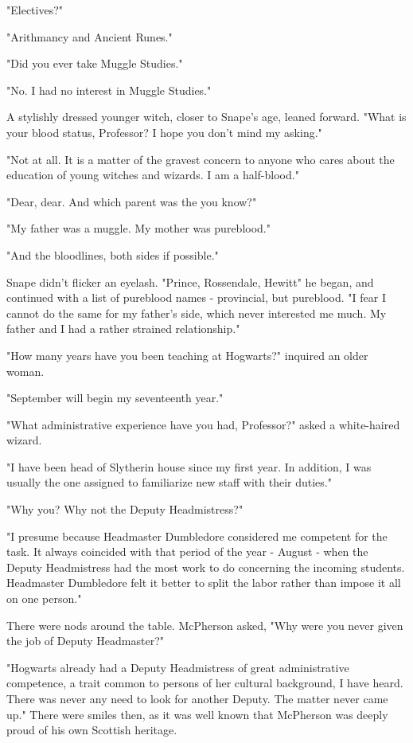 "Electives?"

"Arithmancy and Ancient Runes."

"Did you ever take Muggle Studies."

"No. I had no interest in Muggle Studies."

A stylishly dressed younger witch, closer to Snape's age, leaned forward. "What is your blood status, Professor? I hope you don't mind my asking."

"Not at all. It is a matter of the gravest concern to anyone who cares about the education of young witches and wizards. I am a half-blood."

"Dear, dear. And which parent was the{\el} you know?"

"My father was a muggle. My mother was pureblood."

"And the bloodlines, both sides if possible."

Snape didn't flicker an eyelash. "Prince, Rossendale, Hewitt{\el}" he began, and continued with a list of pureblood names - provincial, but pureblood. "I fear I cannot do the same for my father's side, which never interested me much. My father and I had a rather strained relationship."

"How many years have you been teaching at Hogwarts?" inquired an older woman.

"September will begin my seventeenth year."

"What administrative experience have you had, Professor?" asked a white-haired wizard.

"I have been head of Slytherin house since my first year. In addition, I was usually the one assigned to familiarize new staff with their duties."

"Why you? Why not the Deputy Headmistress?"

"I presume because Headmaster Dumbledore considered me competent for the task. It always coincided with that period of the year - August - when the Deputy Headmistress had the most work to do concerning the incoming students. Headmaster Dumbledore felt it better to split the labor rather than impose it all on one person."

There were nods around the table. McPherson asked, "Why were you never given the job of Deputy Headmaster?"

"Hogwarts already had a Deputy Headmistress of great administrative competence, a trait common to persons of her cultural background, I have heard. There was never any need to look for another Deputy. The matter never came up." There were smiles then, as it was well known that McPherson was deeply proud of his own Scottish heritage.

